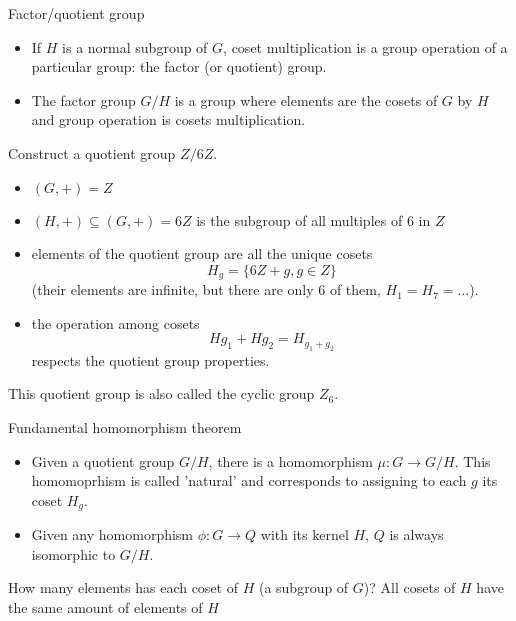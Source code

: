 \documentclass[presentation]{beamer}
\begin{document}
\begin{frame}[label={sec:org62731c6}]{Factor/quotient group}
\begin{itemize}
\item If \(H\) is a normal subgroup of \(G\), coset multiplication is a group
operation of a particular group: the \alert{factor (or quotient) group}.

\item The factor group \(G/H\) is a group where elements are the
cosets of \(G\) by \(H\) and group operation is cosets multiplication.
\end{itemize}
\end{frame}

\begin{frame}[label={sec:org293ac28}]{Construct a quotient group \(Z/6Z\).}
\begin{itemize}
\item \((G, +) = Z\)
\item \((H, +) \subseteq (G,+) = 6Z\) is the subgroup of all multiples of 6 in \(Z\)
\item \alert{elements} of the quotient group are all the unique cosets $$H_g = \{ 6Z + g, g \in Z \}$$
(their elements are infinite, but there are only 6 of them, \(H_1=H_7=\ldots\)).
\item the \alert{operation} among cosets $$Hg_1 + Hg_2 = H_{g_1 + g_2}$$  respects
the quotient group properties.
\end{itemize}

This quotient group is also called \alert{the cyclic group \(Z_6\)}.
\end{frame}

\begin{frame}[label={sec:org1fcbd44}]{Fundamental homomorphism theorem}
\begin{itemize}
\item Given a quotient group \(G/H\), there is a homomorphism \(\mu: G \rightarrow
      G/H\). This homomoprhism is called 'natural' and corresponds to assigning
to each \(g\) its coset \(H_g\).

\item Given any homomorphism \(\phi: G \rightarrow Q\) with its kernel \(H\), \(Q\) is
always isomorphic to \(G/H\).
\end{itemize}
\end{frame}


\begin{frame}[label={sec:org5adbbca}]{How many elements has each coset of \(H\) (a subgroup of \(G\))?}
All cosets of \(H\) have \alert{the same amount} of elements of \(H\)
\end{frame}
\end{document}
